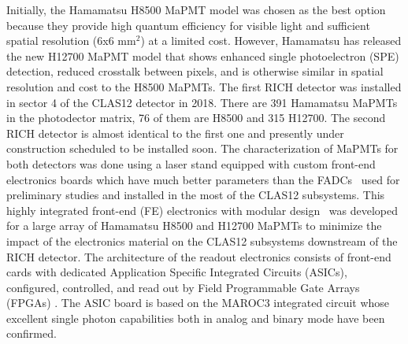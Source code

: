 Initially, the Hamamatsu H8500 MaPMT model \cite{H8500} was chosen as the best option because they provide high quantum efficiency for visible light and sufficient spatial resolution (6x6 mm$^2$) at a limited cost.
However, Hamamatsu has released the new H12700 MaPMT model  \cite{H12700} that shows enhanced single photoelectron (SPE) detection, reduced crosstalk between pixels, and is otherwise similar in spatial resolution and  cost to the H8500 MaPMTs.
The first RICH detector was installed in sector 4 of the CLAS12 detector in 2018.
There are 391 Hamamatsu MaPMTs  in the photodector matrix, 76 of them are H8500 and 315 H12700. 
The second RICH detector is almost identical to the first one and presently under construction scheduled to be installed soon.
The characterization of MaPMTs for both detectors was done using a laser stand equipped with custom front-end electronics boards which have much better parameters than the FADCs~\cite{FADC250} used for preliminary studies and installed in the most of the CLAS12 subsystems.
This highly integrated front-end (FE) electronics with modular design~\cite{RICH_FE} was developed for a large array of Hamamatsu H8500 and H12700 MaPMTs to minimize the impact of the electronics material on the CLAS12 subsystems downstream of the RICH detector.
The architecture of the readout electronics consists of front-end cards with dedicated Application Specific Integrated Circuits (ASICs), configured, controlled, and read out by Field Programmable Gate Arrays (FPGAs) \cite{RICH_FE}.
The ASIC board is based on the MAROC3  integrated circuit \cite{MAROC} whose excellent single photon capabilities both in analog and binary mode have been confirmed.
